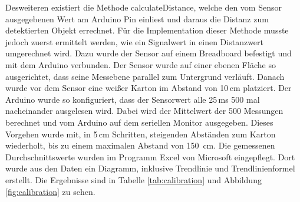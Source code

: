         Desweiteren existiert die Methode calculateDistance, welche den vom Sensor ausgegebenen Wert am Arduino Pin einliest und daraus die Distanz zum detektierten Objekt errechnet. Für die Implementation dieser Methode musste jedoch zuerst ermittelt werden, wie ein Signalwert in einen Distanzwert umgerechnet wird. Dazu wurde der Sensor auf einem Breadboard befestigt und mit dem Arduino verbunden. Der Sensor wurde auf einer ebenen Fläche so ausgerichtet, dass seine Messebene parallel zum Untergrund verläuft. Danach wurde vor dem Sensor eine weißer Karton im Abstand von 10\,cm platziert. Der Arduino wurde so konfiguriert, dass der Sensorwert alle 25\,ms 500 mal nacheinander ausgelesen wird. Dabei wird der Mittelwert der 500 Messungen berechnet und vom Arduino auf dem seriellen Monitor ausgegeben. Dieses Vorgehen wurde mit, in 5\,cm Schritten, steigenden Abständen zum Karton wiederholt, bis zu einem maximalen Abstand von 150\, cm. Die gemessenen Durchschnittswerte wurden im Programm Excel von Microsoft eingepflegt. Dort wurde aus den Daten ein Diagramm, inklusive Trendlinie und Trendlinienformel erstellt. Die Ergebnisse sind in Tabelle \ref{tab:calibration} und Abbildung \ref{fig:calibration} zu sehen.

